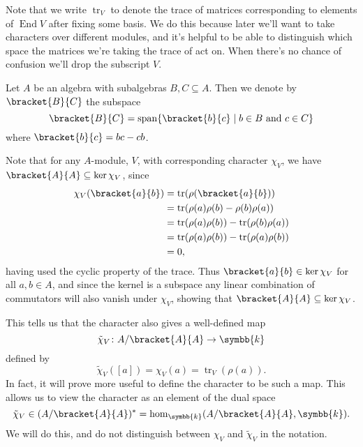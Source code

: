 \documentclass[fleqn]{NotesClass}
\renewcommand{\field}{\symbb{k}}
\DeclareMathOperator{\End}{End}
\DeclareMathOperator{\Span}{span}
\DeclareMathOperator{\tr}{tr}
\begin{document}
    Note that we write \(\tr_V\) to denote the trace of matrices corresponding to elements of \(\End V\) after fixing some basis.
    We do this because later we'll want to take characters over different modules, and it's helpful to be able to distinguish which space the matrices we're taking the trace of act on.
    When there's no chance of confusion we'll drop the subscript \(V\).
    
    \begin{dfn}{}{}
        Let \(A\) be an algebra with subalgebras \(B, C \subseteq A\).
        Then we denote by \(\bracket{B}{C}\) the subspace
        \begin{equation}
            \bracket{B}{C} = \Span \{\bracket{b}{c} \mid b \in B \text{ and } c \in C\}
        \end{equation}
        where \(\bracket{b}{c} = bc - cb\).
    \end{dfn}
    
    Note that for any \(A\)-module, \(V\), with corresponding character \(\chi_V\), we have \(\bracket{A}{A} \subseteq \ker \chi_V\), since
    \begin{align}
        \chi_V(\bracket{a}{b}) &= \tr(\rho(\bracket{a}{b}))\\
        &= \tr(\rho(a)\rho(b) - \rho(b)\rho(a))\\
        &= \tr(\rho(a)\rho(b)) - \tr(\rho(b)\rho(a))\\
        &= \tr(\rho(a)\rho(b)) - \tr(\rho(a)\rho(b))\\
        &= 0,
    \end{align}
    having used the cyclic property of the trace.
    Thus \(\bracket{a}{b} \in \ker \chi_V\) for all \(a, b \in A\), and since the kernel is a subspace any linear combination of commutators will also vanish under \(\chi_V\), showing that \(\bracket{A}{A} \subseteq \ker \chi_V\).
    
    This tells us that the character also gives a well-defined map
    \begin{equation}
        \tilde{\chi}_V \colon A / \bracket{A}{A} \to \field
    \end{equation}
    defined by
    \begin{equation}
        \tilde{\chi}_V([a]) = \chi_V(a) = \tr_V(\rho(a)).
    \end{equation}
    In fact, it will prove more useful to define the character to be such a map.
    This allows us to view the character as an element of the dual space
    \begin{equation}
        \tilde{\chi}_V \in (A/\bracket{A}{A})^* = \hom_{\field}(A/\bracket{A}{A}, \field).
    \end{equation}
    We will do this, and do not distinguish between \(\chi_V\) and \(\tilde{\chi}_V\) in the notation.
    
\end{document}
